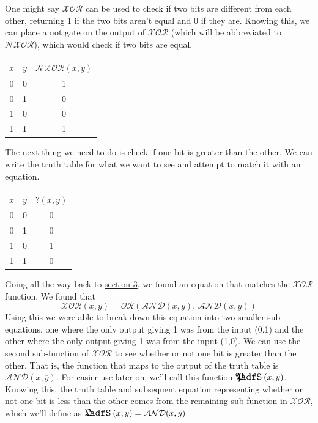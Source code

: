 \documentclass[oneside]{book}
\begin{document}
\tab
One might say $\mathcal{XOR}$ can be used to check if two bits are different from each other, returning 1 if the two bits aren't equal and 0 if they are. Knowing this, we can place a not gate on the output of $\mathcal{XOR}$ (which will be abbreviated to $\mathcal{NXOR}$), which would check if two bits are equal.
\begin{center}
\begin{tabular}{|c|c|c|}
\hline
$x$ & $y$ & $\mathcal{NXOR}(x,y)$ \\
\hline
0 & 0 & 1 \\
0 & 1 & 0 \\
1 & 0 & 0 \\
1 & 1 & 1 \\
\hline
\end{tabular}
\end{center}
\tab
The next thing we need to do is check if one bit is greater than the other. We can write the truth table for what we want to see and attempt to match it with an equation.
\begin{center}
\begin{tabular}{|c|c|c|}
\hline
$x$ & $y$ & $?(x,y)$ \\
\hline
0 & 0 & 0 \\
0 & 1 & 0 \\
1 & 0 & 1 \\
1 & 1 & 0 \\
\hline
\end{tabular}
\end{center}
\tab
Going all the way back to \hyperref[chap:halfsub]{section 3}, we found an equation that matches the $\mathcal{XOR}$ function. We found that 
$$
\mathcal{XOR}(x,y)=\mathcal{OR}(\mathcal{AND}(\overline{x},y),\,\mathcal{AND}(x,\overline{y}))
$$
\tab
Using this we were able to break down this equation into two smaller sub-equations, one where the only output giving 1 was from the input (0,1) and the other where the only output giving 1 was from the input (1,0). We can use the second sub-function of $\mathcal{XOR}$ to see whether or not one bit is greater than the other. That is, the function that maps to the output of the truth table is $\mathcal{AND}(x,\overline{y})$. For easier use later on, we'll call this function $\GreaterThan(x,y)$.
\newline
\tab
Knowing this, the truth table and subsequent equation representing whether or not one bit is less than the other comes from the remaining sub-function in $\mathcal{XOR}$, which we'll define as $\LessThan(x,y)=\mathcal{AND}(\overline{x},y)$
\end{document}
